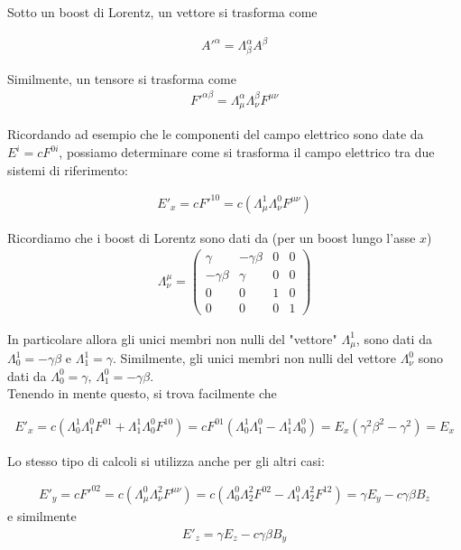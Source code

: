 \documentclass{report}
\begin{document}
Sotto un boost di Lorentz, un vettore si trasforma come 

\begin{align}
    A'^\alpha = \Lambda^{\alpha}_\beta A^{\beta}
\end{align}

Similmente, un tensore si trasforma come 
\begin{align}
    F'^{\alpha \beta} = \Lambda^\alpha_\mu \Lambda^\beta_\nu F^{\mu \nu}
\end{align}

Ricordando ad esempio che le componenti del campo elettrico sono date da \(E^i = cF^{0i}\), possiamo determinare come si trasforma il campo elettrico tra due sistemi di riferimento: 

\begin{align}
    E'_x = c F'^{10} = c(\Lambda^1_\mu \Lambda^0_\nu F^{\mu \nu})
\end{align}

Ricordiamo che i boost di Lorentz sono dati da (per un boost lungo l'asse \(x\))
\begin{align}
    \Lambda^\mu_\nu = \begin{pmatrix}
        \gamma & -\gamma\beta & 0 & 0 \\
        -\gamma\beta & \gamma & 0 & 0 \\
        0 & 0 & 1 & 0 \\
        0 & 0 & 0 & 1 
    \end{pmatrix}
\end{align}

In particolare allora gli unici membri non nulli del "vettore" \(\Lambda^1_\mu\), sono dati da \(\Lambda^1_0 = -\gamma\beta\) e \(\Lambda^1_1 = \gamma\). Similmente, gli unici membri non nulli del vettore \(\Lambda^0_\nu\) sono dati da \(\Lambda^0_0 = \gamma, \, \Lambda^0_1 = -\gamma\beta\). \\
Tenendo in mente questo, si trova facilmente che

\begin{align}
    E'_x = c(\Lambda^1_0\Lambda^0_1F^{01} + \Lambda^1_1\Lambda^0_0 F^{10}) = cF^{01}(\Lambda^1_0\Lambda^0_1 - \Lambda^1_1\Lambda^0_0) = E_x(\gamma^2\beta^2 - \gamma^2) = E_x
\end{align}

Lo stesso tipo di calcoli si utilizza anche per gli altri casi: 

\begin{align}
    E'_y = cF'^{02} = c(\Lambda^0_\mu \Lambda^2_\nu F^{\mu\nu}) = c(\Lambda^0_0\Lambda^2_2F^{02} -\Lambda^0_1\Lambda^2_2F^{12}) = \gamma E_y - c\gamma \beta B_z 
\end{align}
e similmente 
\begin{align}
    E'_z = \gamma E_z - c\gamma\beta B_y
\end{align}
\end{document}
